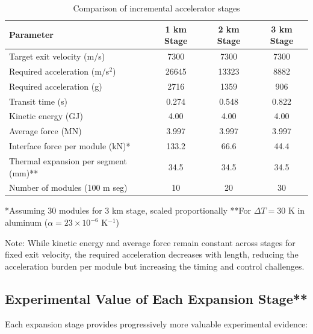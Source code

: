 \begin{table}[htbp]
\centering
\caption{Comparison of incremental accelerator stages}
\label{tab:incremental_comparison}
\begin{tabular}{lccc}
\toprule
Parameter & 1 km Stage & 2 km Stage & 3 km Stage \\
\midrule
Target exit velocity (m/s) & 7300 & 7300 & 7300 \\
Required acceleration (m/s$^2$) & 26645 & 13323 & 8882 \\
Required acceleration (g) & 2716 & 1359 & 906 \\
Transit time (s) & 0.274 & 0.548 & 0.822 \\
Kinetic energy (GJ) & 4.00 & 4.00 & 4.00 \\
Average force (MN) & 3.997 & 3.997 & 3.997 \\
\midrule
Interface force per module (kN)* & 133.2 & 66.6 & 44.4 \\
Thermal expansion per segment (mm)** & 34.5 & 34.5 & 34.5 \\
Number of modules (100 m seg) & 10 & 20 & 30 \\
\bottomrule
\end{tabular}
\end{table}
*Assuming 30 modules for 3 km stage, scaled proportionally
**For $\Delta T = 30$ K in aluminum ($\alpha = 23 \times 10^{-6}$ K$^{-1}$)

Note: While kinetic energy and average force remain constant across stages for fixed exit velocity, the required acceleration decreases with length, reducing the acceleration burden per module but increasing the timing and control challenges.

\subsection{Experimental Value of Each Expansion Stage**}
Each expansion stage provides progressively more valuable experimental evidence:

